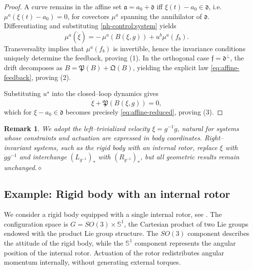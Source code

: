 \documentclass[letterpaper, 10 pt, conference]{ieeeconf}
\newtheorem{remark}{Remark}
\begin{document}
\begin{proof}
A curve remains in the affine set $\mathfrak a = a_0 + \mathfrak d$ iff
$\xi(t)-a_0\in\mathfrak d$, i.e. $\mu^a(\xi(t)-a_0)=0$, for covectors $\mu^a$ spanning the annihilator of $\mathfrak d$.  
Differentiating and substituting \eqref{nh-control:system} yields
\[
\mu^a(\dot\xi)
= -\,\mu^a(B(\xi,g))
  + u^b\mu^a(f_b).
\]
Transversality implies that $\mu^a(f_b)$ is invertible, hence the invariance
conditions uniquely determine the feedback, proving (1). In the orthogonal case $\mathfrak f=\mathfrak d^\perp$, the drift decomposes as
$B = \mathfrak P(B) + \mathfrak Q(B)$, yielding the explicit law
\eqref{eq:affine-feedback}, proving (2).

Substituting $u^\star$ into the closed--loop dynamics gives
\[
\dot\xi + \mathfrak{P}(B(\xi,g)) = 0,
\]
which for $\xi-a_0\in\mathfrak d$ becomes precisely 
\eqref{eq:affine-reduced}, proving (3).
\end{proof}


\begin{remark}
We adopt the left--trivialized velocity $\xi=g^{-1}\dot g$, natural for systems
whose constraints and actuation are expressed in body coordinates.
Right--invariant systems, such as the rigid body with an internal rotor,
replace $\xi$ with $\dot g g^{-1}$ and interchange 
$(L_{g^{-1}})_{\ast}$ with $(R_{g^{-1}})_{\ast}$, but all geometric results
remain unchanged.\hfill$\diamond$
\end{remark}


\subsection{Example: Rigid body with an internal rotor}

We consider a rigid body equipped with a single internal rotor, see \cite{bloch1992stabilization}. The configuration space is $G = SO(3) \times \mathbb{S}^{1}$, the Cartesian product of two Lie groups endowed with the product Lie group structure. The $SO(3)$ component describes the attitude of the rigid body, while the $\mathbb{S}^{1}$ component represents the angular position of the internal rotor. Actuation of the rotor redistributes angular momentum internally, without generating external torques.
\end{document}
